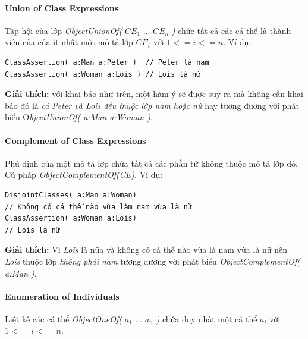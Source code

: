 \paragraph{Union of Class Expressions} Tập hội của lớp \textit{ObjectUnionOf(} $CE_{1}$ ... $CE_{n}$ \textit{)} chức tất cả các cá thể là thành viên của của ít nhất một mô tả lớp $CE_{i}$ với $1<=i<=n$. Ví dụ:
\begin{verbatim}
ClassAssertion( a:Man a:Peter )	 // Peter là nam
ClassAssertion( a:Woman a:Lois ) // Lois là nữ
\end{verbatim}
\textbf{Giải thích: } với khai báo như trên, một hàm ý sẽ được suy ra mà không cần khai báo đó là \textit{cả Peter và Lois đều thuộc lớp nam hoặc nữ} hay tương đương với phát biểu O\textit{bjectUnionOf( a:Man a:Woman )}.

\paragraph{Complement of Class Expressions} Phủ định của một mô tả lớp chứa tất cả các phần tử không thuộc mô tả lớp đó. Cú pháp \textit{ObjectComplementOf(CE)}. Ví dụ:
\begin{verbatim}
DisjointClasses( a:Man a:Woman) 
// Không có cá thể nào vừa làm nam vừa là nữ
ClassAssertion( a:Woman a:Lois) 
// Lois là nữ
\end{verbatim}
\textbf{Giải thích:} Vì \textit{Lois} là nữa và không có cá thể nào vừa là nam vừa là nữ nên \textit{Lois} thuộc lớp \textit{không phải nam} tương đương với phát biểu \textit{ObjectComplementOf( a:Man )}.

\paragraph{Enumeration of Individuals} Liệt kê các cá thể \textit{ObjectOneOf(} $a_{1}$ ... $a_{n}$ \textit{)} chứa duy nhất một cá thể $a_{i}$ với $1<=i<=n$. 

